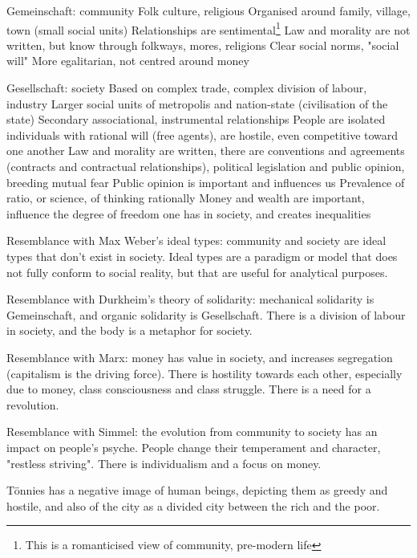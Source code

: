 \documentclass{article}
\begin{document}
\begin{outline}
	\1 Gemeinschaft: community
		\2 Folk culture, religious 
		\2 Organised around family, village, town (small social units) 
 		\2 Relationships are sentimental\footnote{This is a romanticised view of community, pre-modern life} 
		\2 Law and morality are not written, but know through folkways, mores, religions 
		\2 Clear social norms, "social will"
		\2 More egalitarian, not centred around money
		
	\1 Gesellschaft: society
		\2 Based on complex trade, complex division of labour, industry 
		\2 Larger social units of metropolis and nation-state (civilisation of the state)
		\2 Secondary associational, instrumental relationships
		\2 People are isolated individuals with rational will (free agents), are hostile, even competitive toward one another
		\2 Law and morality are written, there are conventions and agreements (contracts and contractual relationships), political legislation and public opinion, breeding mutual fear
		\2 Public opinion is important and influences us
		\2 Prevalence of ratio, or science, of thinking rationally
		\2 Money and wealth are important, influence the degree of freedom one has in society, and creates inequalities
\end{outline}


Resemblance with Max Weber's ideal types: community and society are ideal types that don't exist in society. Ideal types are a paradigm or model that does not fully conform to social reality, but that are useful for analytical purposes.

Resemblance with Durkheim's theory of solidarity: mechanical solidarity is Gemeinschaft, and organic solidarity is Gesellschaft. There is a division of labour in society, and the body is a metaphor for society.

Resemblance with Marx: money has value in society, and increases segregation (capitalism is the driving force). There is hostility towards each other, especially due to money, class consciousness and class struggle. There is a need for a revolution.

Resemblance with Simmel: the evolution from community to society has an impact on people's psyche. People change their temperament and character, "restless striving". There is individualism and a focus on money.

Tönnies has a negative image of human beings, depicting them as greedy and hostile, and also of the city as a divided city between the rich and the poor.
\end{document}

